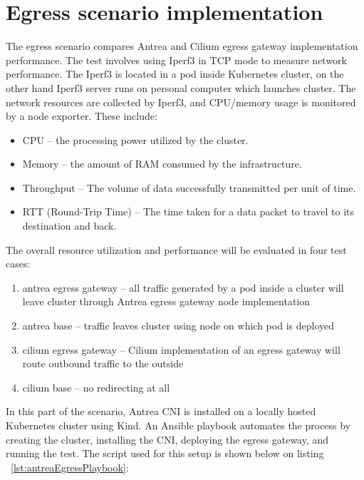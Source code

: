 

\section{Egress scenario implementation}
\label{sec:egressImpl}


The egress scenario compares Antrea and Cilium egress gateway implementation performance. The test involves using Iperf3 in TCP mode to measure network performance. The Iperf3 is located in a pod inside Kubernetes cluster, on the other hand Iperf3 server runs on personal computer which launches cluster. The network resources are collected by Iperf3, and CPU/memory usage is monitored by a node exporter. These include:
\begin{itemize}
  \item CPU -- the processing power utilized by the cluster.
  \item Memory -- the amount of RAM consumed by the infrastructure.
  \item Throughput -- The volume of data successfully transmitted per unit of time.
  \item RTT (Round-Trip Time) -- The time taken for a data packet to travel to its destination and back.
\end{itemize}

The overall resource utilization and performance will be evaluated in four test cases:

\begin{enumerate}
  \item antrea egress gateway -- all traffic generated by a pod inside a cluster will leave cluster through Antrea egress gateway node implementation
  \item antrea base -- traffic leaves cluster using node on which pod is deployed
  \item cilium egress gateway -- Cilium implementation of an egress gateway will route outbound traffic to the outside
  \item cilium base -- no redirecting at all
\end{enumerate}


In this part of the scenario, Antrea CNI is installed on a locally hosted Kubernetes cluster using Kind. An Ansible playbook automates the process by creating the cluster, installing the CNI, deploying the egress gateway, and running the test. The script used for this setup is shown below on listing ~\ref{lst:antreaEgressPlaybook}:

